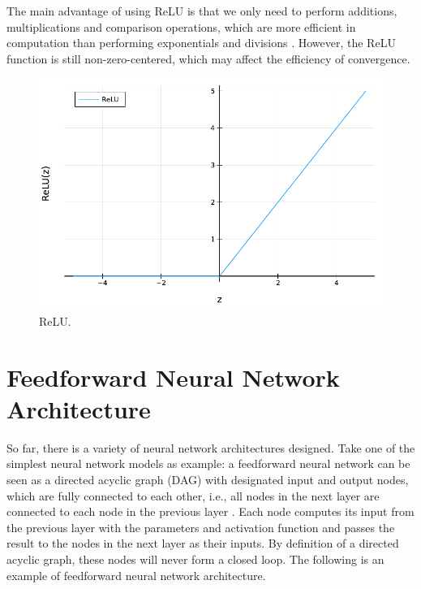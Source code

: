 \documentclass[
	parskip, 			   %
	twoside, 			   %
	DIV=14, 			   %
	BCOR=15.0mm, 		   %
	headsepline, 		   %
	open=right, 		   %
	captions=tableheading, %
	bibliography=totoc,    %
	numbers=noenddot       %
]{scrreprt}
\begin{document}
The main advantage of using ReLU is that we only need to perform additions, multiplications and comparison operations, which are more efficient in computation than performing exponentials and divisions \cite{nwankpa2018activation}. However, the ReLU function is still non-zero-centered, which may affect the efficiency of convergence. 

\begin{figure}[h!]
    \centering
    \includegraphics[scale=0.7]{figures/ReLU.pdf}
    \caption{ReLU.}
    \label{fig:ReLU}
\end{figure}


\section{Feedforward Neural Network Architecture}
So far, there is a variety of neural network architectures designed. Take one of the simplest neural network models as example: a feedforward neural network can be seen as a directed acyclic graph (DAG) with designated input and output nodes, which are fully connected to each other, i.e., all nodes in the next layer are connected to each node in the previous layer \cite{russell2010artificial}. Each node computes its input from the previous layer with the parameters and activation function and passes the result to the nodes in the next layer as their inputs. By definition of a directed acyclic graph, these nodes will never form a closed loop. The following is an example of feedforward neural network architecture.
\end{document}

